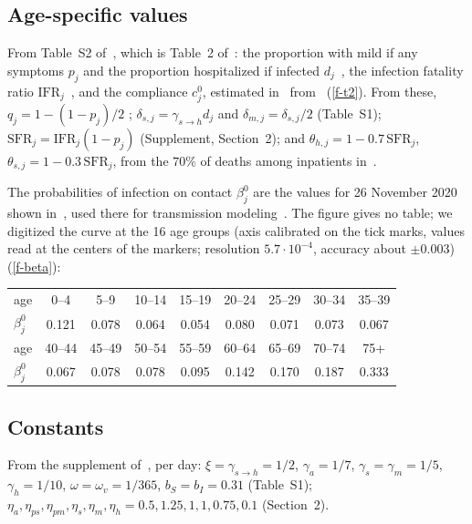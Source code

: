 \documentclass[11pt]{article}
\theoremstyle{remark}
\newcommand{\fref}[1]{\ref{#1}}
\begin{document}
\subsection{Age-specific values}\label{sec-age}

From Table~S2 of~\cite{2026Feng_Day_Glasser}, which is Table~2
of~\cite{2023Glasser_Feng}: the proportion with mild if any symptoms $p_j$ and
the proportion hospitalized if infected $d_j$~\cite{2020Clark_Jit}, the infection
fatality ratio $\mathrm{IFR}_j$~\cite{2020Levin_Hanage}, and the compliance $c_j^0$,
estimated in~\cite[Section~4.1]{2023Glasser_Feng} from~\cite{2020Jones_YouGov}
(\fref{f-t2}). From these, $q_j=1-(1-p_j)/2$ \cite[Table~2]{2026Feng_Day_Glasser};
$\delta_{s,j}=\gamma_{s\to h}d_j$ and $\delta_{m,j}=\delta_{s,j}/2$ (Table~S1);
$\mathrm{SFR}_j=\mathrm{IFR}_j(1-p_j)$ (Supplement, Section~2); and
$\theta_{h,j}=1-0.7\,\mathrm{SFR}_j$, $\theta_{s,j}=1-0.3\,\mathrm{SFR}_j$, from the
$70\%$ of deaths among inpatients in~\cite[Section~3]{2023Glasser_Feng}.

The probabilities of infection on contact $\beta_j^0$ are the values for 26 November
2020 shown in~\cite[Fig.~4]{2023Glasser_Feng}, used there for transmission
modeling~\cite[Section~2.3]{2023Glasser_Feng}. The figure gives no table; we
digitized the curve at the 16 age groups (axis calibrated on the tick marks,
values read at the centers of the markers; resolution $5.7\cdot10^{-4}$, accuracy
about $\pm0.003$) (\fref{f-beta}):
\begin{center}
\small
\begin{tabular}{l*{8}{c}}
age & 0--4 & 5--9 & 10--14 & 15--19 & 20--24 & 25--29 & 30--34 & 35--39\\
$\beta_j^0$ & 0.121 & 0.078 & 0.064 & 0.054 & 0.080 & 0.071 & 0.073 & 0.067\\\hline
age & 40--44 & 45--49 & 50--54 & 55--59 & 60--64 & 65--69 & 70--74 & 75+\\
$\beta_j^0$ & 0.067 & 0.078 & 0.078 & 0.095 & 0.142 & 0.170 & 0.187 & 0.333
\end{tabular}
\end{center}

\subsection{Constants}\label{sec-const}

From the supplement of~\cite{2026Feng_Day_Glasser}, per day:
$\xi=\gamma_{s\to h}=1/2$, $\gamma_a=1/7$, $\gamma_s=\gamma_m=1/5$, $\gamma_h=1/10$,
$\omega=\omega_v=1/365$, $b_S=b_I=0.31$ (Table~S1);
$\eta_a,\eta_{ps},\eta_{pm},\eta_s,\eta_m,\eta_h=0.5,1.25,1,1,0.75,0.1$ (Section~2).
\end{document}
